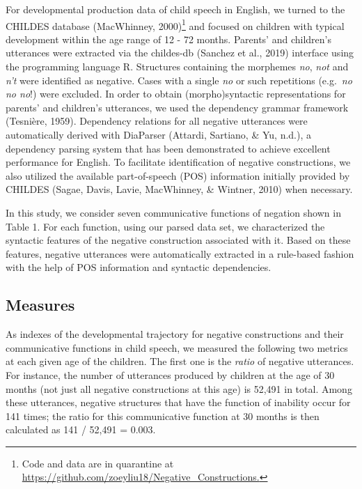 \documentclass[10pt, letterpaper]{article}
\begin{document}
For developmental production data of child speech in English, we turned
to the CHILDES database (MacWhinney,
2000)\footnote{Code and data are in quarantine at \url{https://github.com/zoeyliu18/Negative_Constructions.}}
and focused on children with typical development within the age range of
12 - 72 months. Parents' and children's utterances were extracted via
the childes-db (Sanchez et al., 2019) interface using the programming
language R. Structures containing the morphemes \emph{no}, \emph{not}
and \emph{n't} were identified as negative. Cases with a single
\emph{no} or such repetitions (e.g.~\emph{no no no}!) were excluded. In
order to obtain (morpho)syntactic representations for parents' and
children's utterances, we used the dependency grammar framework
(Tesnière, 1959). Dependency relations for all negative utterances were
automatically derived with DiaParser (Attardi, Sartiano, \& Yu, n.d.), a
dependency parsing system that has been demonstrated to achieve
excellent performance for English. To facilitate identification of
negative constructions, we also utilized the available part-of-speech
(POS) information initially provided by CHILDES (Sagae, Davis, Lavie,
MacWhinney, \& Wintner, 2010) when necessary.

In this study, we consider seven communicative functions of negation
shown in Table 1. For each function, using our parsed data set, we
characterized the syntactic features of the negative construction
associated with it. Based on these features, negative utterances were
automatically extracted in a rule-based fashion with the help of POS
information and syntactic dependencies.

\hypertarget{measures}{%
\subsection{Measures}\label{measures}}

As indexes of the developmental trajectory for negative constructions
and their communicative functions in child speech, we measured the
following two metrics at each given age of the children. The first one
is the \emph{ratio} of negative utterances. For instance, the number of
utterances produced by children at the age of 30 months (not just all
negative constructions at this age) is 52,491 in total. Among these
utterances, negative structures that have the function of inability
occur for 141 times; the ratio for this communicative function at 30
months is then calculated as 141 / 52,491 = 0.003.
\end{document}
